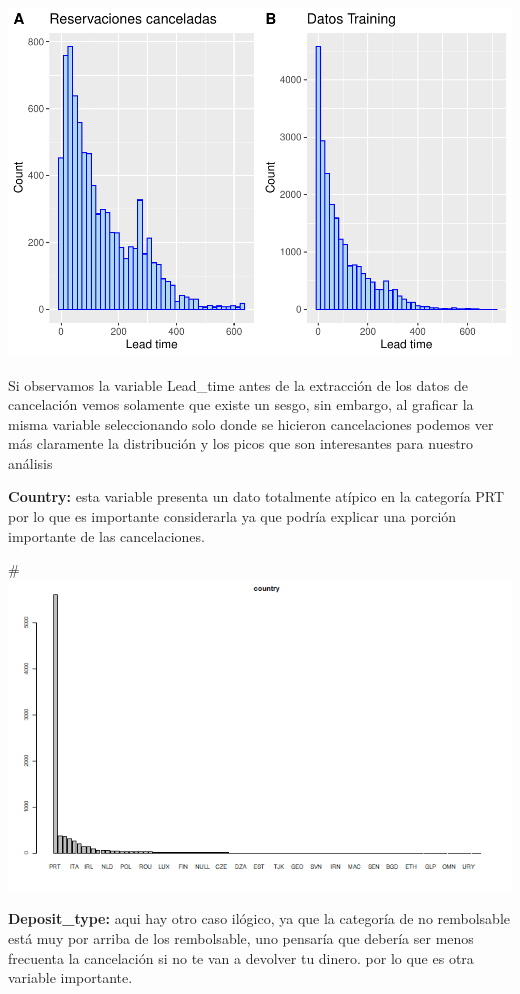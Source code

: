 \documentclass[
]{article}
\begin{document}
\begin{center}\includegraphics{report_files/figure-latex/unnamed-chunk-6-1} \end{center}

Si observamos la variable Lead\_time antes de la extracción de los datos
de cancelación vemos solamente que existe un sesgo, sin embargo, al
graficar la misma variable seleccionando solo donde se hicieron
cancelaciones podemos ver más claramente la distribución y los picos que
son interesantes para nuestro análisis

\textbf{Country:} esta variable presenta un dato totalmente atípico en
la categoría PRT por lo que es importante considerarla ya que podría
explicar una porción importante de las cancelaciones.

\#\includegraphics{country.png}

\textbf{Deposit\_type:} aqui hay otro caso ilógico, ya que la categoría
de no rembolsable está muy por arriba de los rembolsable, uno pensaría
que debería ser menos frecuenta la cancelación si no te van a devolver
tu dinero. por lo que es otra variable importante.
\end{document}
